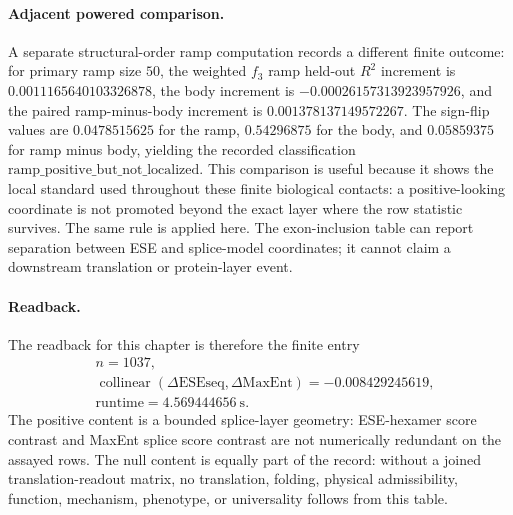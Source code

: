 \paragraph{Adjacent powered comparison.}
A separate structural-order ramp computation records a different finite outcome: for primary ramp size $50$, the weighted $f_3$ ramp held-out $R^2$ increment is $0.0011165640103326878$, the body increment is $-0.00026157313923957926$, and the paired ramp-minus-body increment is $0.001378137149572267$.  The sign-flip values are $0.0478515625$ for the ramp, $0.54296875$ for the body, and $0.05859375$ for ramp minus body, yielding the recorded classification $\mathrm{ramp\_positive\_but\_not\_localized}$.  This comparison is useful because it shows the local standard used throughout these finite biological contacts: a positive-looking coordinate is not promoted beyond the exact layer where the row statistic survives.  The same rule is applied here.  The exon-inclusion table can report separation between ESE and splice-model coordinates; it cannot claim a downstream translation or protein-layer event.

\paragraph{Readback.}
The readback for this chapter is therefore the finite entry
$$
\begin{aligned}
&n=1037,\\
&\operatorname{collinear}(\Delta\mathrm{ESEseq},\Delta\mathrm{MaxEnt})=-0.008429245619,\\
&\mathrm{runtime}=4.569444656\ \mathrm{s}.
\end{aligned}
$$
The positive content is a bounded splice-layer geometry: ESE-hexamer score contrast and MaxEnt splice score contrast are not numerically redundant on the assayed rows.  The null content is equally part of the record: without a joined translation-readout matrix, no translation, folding, physical admissibility, function, mechanism, phenotype, or universality follows from this table.